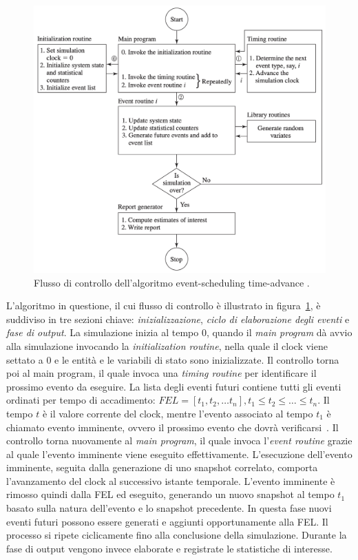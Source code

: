 \documentclass[12pt,a4paper,openright,twoside]{book}
\begin{document}
\begin{figure}
    \centering
    \includegraphics[width=.90\linewidth]{figures/discrete-event-simulation/time-advance-flow.png}
    \caption{Flusso di controllo dell'algoritmo event-scheduling time-advance \cite{Law15}.}
    \label{fig:next-event-flow}
\end{figure}

L'algoritmo in questione, il cui flusso di controllo è illustrato in figura~\ref{fig:next-event-flow}, è suddiviso in tre sezioni chiave: \textit{inizializzazione}, \textit{ciclo di elaborazione degli eventi} e \textit{fase di output}.
La simulazione inizia al tempo 0, quando il \textit{main program} dà avvio alla simulazione invocando la \textit{initialization routine}, nella quale il clock viene settato a 0 e le entità e le variabili di stato sono inizializzate.
Il controllo torna poi al main program, il quale invoca una \textit{timing routine} per identificare il prossimo evento da eseguire.
La lista degli eventi futuri contiene tutti gli eventi ordinati per tempo di accadimento: $FEL = [t_1, t_2, \dots t_n], t_1 \leq t_2 \leq \dots \leq t_n$. 
Il tempo $t$ è il valore corrente del clock, mentre l'evento associato al tempo $t_1$ è chiamato evento imminente, ovvero il prossimo evento che dovrà verificarsi~\cite{DBLP:books/daglib/0034857}.
Il controllo torna nuovamente al \textit{main program}, il quale invoca l'\textit{event routine} grazie al quale l'evento imminente viene eseguito effettivamente. 
L'esecuzione dell'evento imminente, seguita dalla generazione di uno snapshot correlato, comporta l'avanzamento del clock al successivo istante temporale. L'evento imminente è rimosso quindi dalla FEL ed eseguito, generando un nuovo snapshot al tempo $t_1$ basato sulla natura dell'evento e lo snapshot precedente. In questa fase nuovi eventi futuri possono essere generati e aggiunti opportunamente alla FEL.
Il processo si ripete ciclicamente fino alla conclusione della simulazione. 
Durante la fase di output vengono invece elaborate e registrate le statistiche di interesse. 
\end{document}
